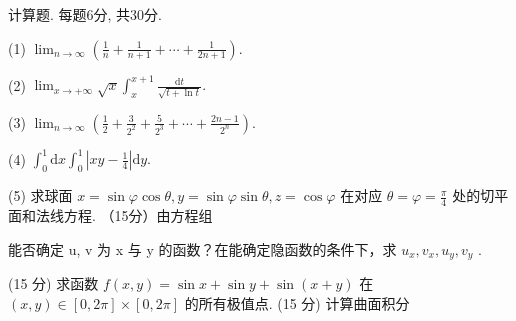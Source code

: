 \par{}
计算题. 每题6分, 共30分.\par
(1)  $\lim_{n\to\infty}\left(\frac{1}{n}+\frac{1}{n+1}+\cdots+\frac{1}{2n+1}\right).$\par
(2) $\lim_{x\to +\infty}\sqrt{x}\int_{x}^{x + 1}\frac{\mathrm{d}t}{\sqrt{t + \ln t}}.$\par
(3)  $\lim_{n\to\infty}\left(\frac{1}{2}+\frac{3}{2^{2}}+\frac{5}{2^{3}}+\cdots+\frac{2n-1}{2^{n}}\right).$\par
(4) $\int_0^1\mathrm{d}x\int_0^1\left|xy - \frac{1}{4}\right|\mathrm{d}y.$\par
\par{}
(5) 求球面 $x = \sin \varphi \cos \theta, y = \sin \varphi \sin \theta, z = \cos \varphi$ 在对应 $\theta = \varphi = \frac{\pi}{4}$ 处的切平面和法线方程.
（15分）由方程组\par
\nopagebreak[4]
能否确定 u, v 为 x 与 y 的函数？在能确定隐函数的条件下，求  $u_{x}, v_{x}, u_{y}, v_{y}$ .\par
\par{}
\par{}
(15 分) 求函数 $f(x, y) = \sin x + \sin y + \sin (x + y)$ 在 $(x, y) \in [0, 2\pi] \times [0, 2\pi]$ 的所有极值点.
(15 分) 计算曲面积分\par
\nopagebreak[4]
